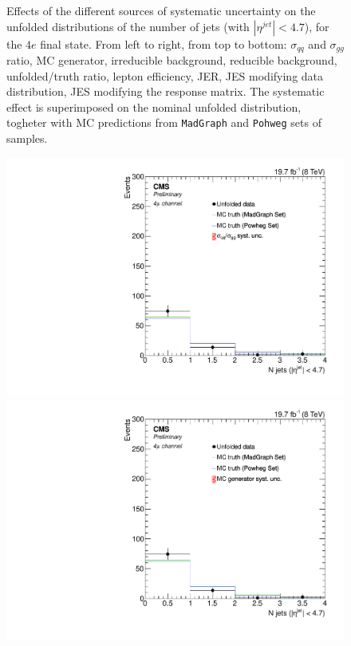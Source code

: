 \begin{figure}[hbtp]
\begin{center}
       \caption{Effects of the different sources of systematic uncertainty on the unfolded distributions of the number of jets (with $|\eta^{jet}|<4.7$), for the     
    $4e$ final state. From left to right, from top to bottom: $\sigma_{qq}$ and $\sigma_{gg}$ ratio, MC generator, irreducible background,
reducible background, unfolded/truth ratio, lepton efficiency, JER, JES modifying data distribution, JES modifying the response matrix. The systematic effect is superimposed on the nominal unfolded distribution, togheter with MC predictions from \texttt{MadGraph} and \texttt{Pohweg} sets of samples.}
    \label{fig:Jets_syst_4e}
  \end{center}
\end{figure}

\begin{figure}[hbtp]
  \begin{center}
    \includegraphics[width=0.8\cmsFigWidth]{Figures/Unfolding/Systematics/ZZTo4m_Jets_qqgg_Mad_fr}     
    \includegraphics[width=0.8\cmsFigWidth]{Figures/Unfolding/Systematics/ZZTo4m_Jets_MCgen_Mad_fr}     

\end{center}
\end{figure}
